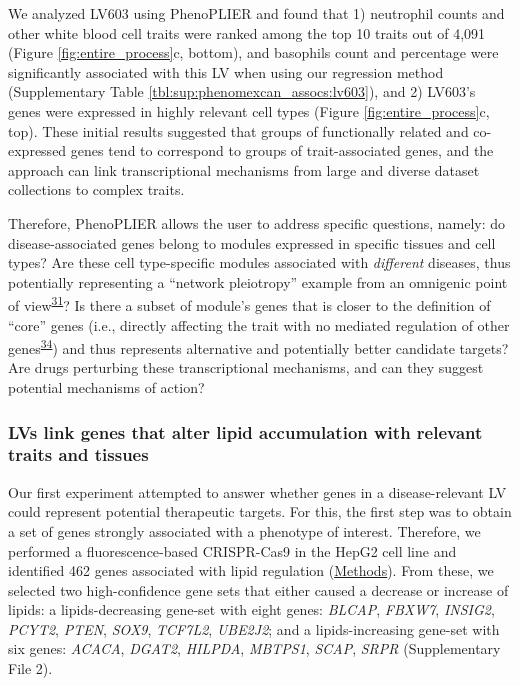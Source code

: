 \documentclass[
  a4paper,
]{article}
\begin{document}
We analyzed LV603 using PhenoPLIER and found that
1) neutrophil counts and other white blood cell traits were ranked among the top 10 traits out of 4,091 (Figure \ref{fig:entire_process}c, bottom), and basophils count and percentage were significantly associated with this LV when using our regression method (Supplementary Table \ref{tbl:sup:phenomexcan_assocs:lv603}),
and 2) LV603's genes were expressed in highly relevant cell types (Figure \ref{fig:entire_process}c, top).
These initial results suggested that groups of functionally related and co-expressed genes tend to correspond to groups of trait-associated genes, and the approach can link transcriptional mechanisms from large and diverse dataset collections to complex traits.

Therefore, PhenoPLIER allows the user to address specific questions, namely:
do disease-associated genes belong to modules expressed in specific tissues and cell types?
Are these cell type-specific modules associated with \emph{different} diseases, thus potentially representing a ``network pleiotropy'' example from an omnigenic point of view\textsuperscript{\protect\hyperlink{ref-vpIDZCSa}{31}}?
Is there a subset of module's genes that is closer to the definition of ``core'' genes (i.e., directly affecting the trait with no mediated regulation of other genes\textsuperscript{\protect\hyperlink{ref-LXvTZzEA}{34}}) and thus represents alternative and potentially better candidate targets?
Are drugs perturbing these transcriptional mechanisms, and can they suggest potential mechanisms of action?

\hypertarget{lvs-link-genes-that-alter-lipid-accumulation-with-relevant-traits-and-tissues}{%
\subsubsection{LVs link genes that alter lipid accumulation with relevant traits and tissues}\label{lvs-link-genes-that-alter-lipid-accumulation-with-relevant-traits-and-tissues}}

Our first experiment attempted to answer whether genes in a disease-relevant LV could represent potential therapeutic targets.
For this, the first step was to obtain a set of genes strongly associated with a phenotype of interest.
Therefore, we performed a fluorescence-based CRISPR-Cas9 in the HepG2 cell line and identified 462 genes associated with lipid regulation (\protect\hyperlink{sec:methods:crispr}{Methods}).
From these, we selected two high-confidence gene sets that either caused a decrease or increase of lipids:
a lipids-decreasing gene-set with eight genes: \emph{BLCAP}, \emph{FBXW7}, \emph{INSIG2}, \emph{PCYT2}, \emph{PTEN}, \emph{SOX9}, \emph{TCF7L2}, \emph{UBE2J2};
and a lipids-increasing gene-set with six genes: \emph{ACACA}, \emph{DGAT2}, \emph{HILPDA}, \emph{MBTPS1}, \emph{SCAP}, \emph{SRPR} (Supplementary File 2).
\end{document}
